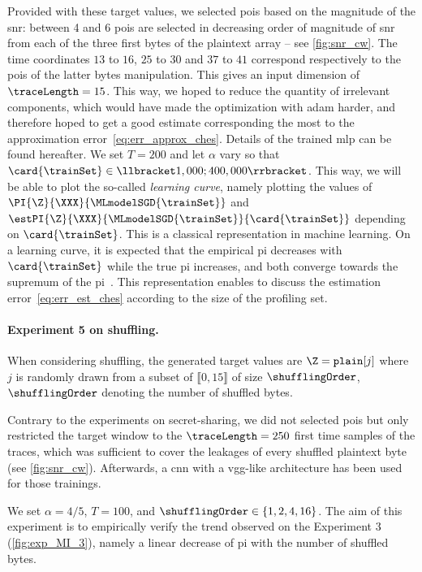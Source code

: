 Provided with these target values, we selected \glspl{poi} based on the magnitude of the \gls{snr}: between 4 and 6 \glspl{poi} are selected in decreasing order of magnitude of \gls{snr} from each of the three first bytes of the plaintext array -- see \autoref{fig:snr_cw}.
The time coordinates \(13\) to \(16\), \(25\) to \(30\) and \(37\) to \(41\) correspond respectively to the \glspl{poi} of the latter bytes manipulation. 
This gives an input dimension of \(\traceLength = 15\).
This way, we hoped to reduce the quantity of irrelevant components, which would have made the optimization with \gls{adam} harder, and therefore hoped to get a good estimate corresponding the most to the approximation error~\eqref{eq:err_approx_ches}.
Details of the trained \gls{mlp} can be found hereafter.
We set \(T = 200\) and let \(\alpha\) vary so that \(\card{\trainSet} \in \llbracket 1,000; 400,000\rrbracket\). 
This way, we will be able to plot the so-called \emph{learning curve}, namely plotting the values of \(\PI{\Z}{\XXX}{\MLmodelSGD{\trainSet}}\) and \(\estPI{\Z}{\XXX}{\MLmodelSGD{\trainSet}}{\card{\trainSet}}\) depending on \(\card{\trainSet}\).
This is a classical representation in machine learning.
On a learning curve, it is expected that the empirical \gls{pi} decreases with \(\card{\trainSet}\) while the true \gls{pi} increases, and both converge towards the supremum of the \gls{pi}~\cite{vapnik_nature_1995}.
This representation enables to discuss the estimation error~\eqref{eq:err_est_ches} according to the size of the profiling set.


\paragraph{Experiment 5 on shuffling.}
When considering shuffling, the generated target values are \(\Z = \verb+plain+[j]\) where \(j\) is randomly drawn from a subset of \(\llbracket 0, 15 \rrbracket\) of size \(\shufflingOrder\), \(\shufflingOrder\) denoting the number of shuffled bytes.

Contrary to the experiments on secret-sharing, we did not selected \glspl{poi} but only restricted the target window to the \(\traceLength = 250\) first time samples of the traces, which was sufficient to cover the leakages of every shuffled plaintext byte (see \autoref{fig:snr_cw}).
Afterwards, a \gls{cnn} with a \gls{vgg}-like architecture has been used for those trainings.

We set \(\alpha = 4/5\), \(T = 100\), and \(\shufflingOrder \in \{1, 2, 4, 16\}\).
The aim of this experiment is to empirically verify the trend observed on the Experiment 3 (\autoref{fig:exp_MI_3}), namely a linear decrease of \gls{pi} with the number of shuffled bytes.
